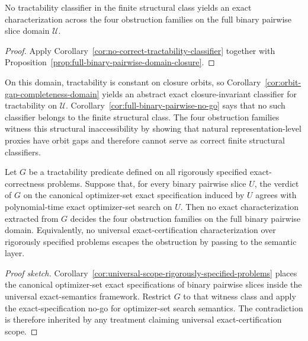 \begin{corollary}\label{cor:full-binary-pairwise-no-go}
No tractability classifier in the finite structural class yields an exact characterization across the four obstruction families on the full binary pairwise slice domain $\mathcal U$.
\end{corollary}

\begin{proof}
Apply Corollary~\ref{cor:no-correct-tractability-classifier} together with Proposition~\ref{prop:full-binary-pairwise-domain-closure}.
\end{proof}

On this domain, tractability is constant on closure orbits, so Corollary~\ref{cor:orbit-gap-completeness-domain} yields an abstract exact closure-invariant classifier for tractability on $\mathcal U$. Corollary~\ref{cor:full-binary-pairwise-no-go} says that no such classifier belongs to the finite structural class. The four obstruction families witness this structural inaccessibility by showing that natural representation-level proxies have orbit gaps and therefore cannot serve as correct finite structural classifiers.

\begin{corollary}\label{cor:universal-exact-specification-no-go}
Let $G$ be a tractability predicate defined on all rigorously specified exact-correctness problems. Suppose that, for every binary pairwise slice $U$, the verdict of $G$ on the canonical optimizer-set exact specification induced by $U$ agrees with polynomial-time exact optimizer-set search on $U$. Then no exact characterization extracted from $G$ decides the four obstruction families on the full binary pairwise domain. Equivalently, no universal exact-certification characterization over rigorously specified problems escapes the obstruction by passing to the semantic layer.
\end{corollary}

\begin{proof}[Proof sketch]
Corollary~\ref{cor:universal-scope-rigorously-specified-problems} places the canonical optimizer-set exact specifications of binary pairwise slices inside the universal exact-semantics framework. Restrict $G$ to that witness class and apply the exact-specification no-go for optimizer-set search semantics. The contradiction is therefore inherited by any treatment claiming universal exact-certification scope.
\end{proof}

